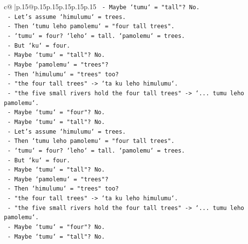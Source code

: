 \documentclass{article}
\begin{document}
{\begin{supertabular}{c@{$\;$}|p{.15\linewidth}@{}p{.15\linewidth}p{.15\linewidth}p{.15\linewidth}p{.15\linewidth}p{.15\linewidth}}
{{{\texttt{                    {-} Maybe `tumu` = "tall"? No.} \\
\texttt{                    {-} Let's assume `himulumu` = trees.} \\
\texttt{                    {-} Then `tumu leho pamolemu` = "four tall trees".} \\
\texttt{                    {-} `tumu` = four? `leho` = tall. `pamolemu` = trees.} \\
\texttt{                    {-} But `ku` = four.} \\
\texttt{                    {-} Maybe `tumu` = "tall"? No.} \\
\texttt{                    {-} Maybe `pamolemu` = "trees"?} \\
\texttt{                    {-} Then `himulumu` = "trees" too?} \\
\texttt{                    {-} "the four tall trees" {-}> `ta ku leho himulumu`.} \\
\texttt{                    {-} "the five small rivers hold the four tall trees" {-}> `... tumu leho pamolemu`.} \\
\texttt{                    {-} Maybe `tumu` = "four"? No.} \\
\texttt{                    {-} Maybe `tumu` = "tall"? No.} \\
\texttt{                    {-} Let's assume `himulumu` = trees.} \\
\texttt{                    {-} Then `tumu leho pamolemu` = "four tall trees".} \\
\texttt{                    {-} `tumu` = four? `leho` = tall. `pamolemu` = trees.} \\
\texttt{                    {-} But `ku` = four.} \\
\texttt{                    {-} Maybe `tumu` = "tall"? No.} \\
\texttt{                    {-} Maybe `pamolemu` = "trees"?} \\
\texttt{                    {-} Then `himulumu` = "trees" too?} \\
\texttt{                    {-} "the four tall trees" {-}> `ta ku leho himulumu`.} \\
\texttt{                    {-} "the five small rivers hold the four tall trees" {-}> `... tumu leho pamolemu`.} \\
\texttt{                    {-} Maybe `tumu` = "four"? No.} \\
\texttt{                    {-} Maybe `tumu` = "tall"? No.} \\
}}}
\end{supertabular}}
\end{document}
